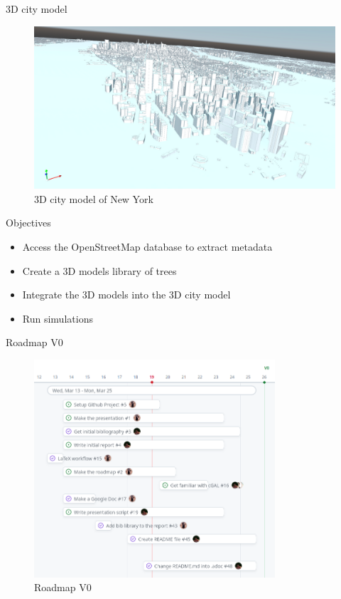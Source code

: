 \documentclass[10pt]{beamer}
\begin{document}
\begin{frame}{3D city model}
  \begin{figure}[h] %
    \centering
    \includegraphics[width=1\textwidth]{images/NY_mesh.png}
    \caption{3D city model of New York \cite{NY-mesh}} %
    \label{fig:3d_city_model} %
  \end{figure} %
\end{frame}

\begin{frame}{Objectives}
  \begin{itemize}
    \item<1-> Access the OpenStreetMap database to extract metadata
    \item<2-> Create a 3D models library of trees
    \item<3-> Integrate the 3D models into the 3D city model
    \item<4-> Run simulations
  \end{itemize}
\end{frame}

\begin{frame}{Roadmap V0}
  \begin{figure}[h] %
    \centering
    \includegraphics[width=0.8\textwidth]{images/roadmap_v0.png}
    \caption{Roadmap V0} %
    \label{fig:roadmap_v0} %
    \end{figure}
\end{frame}
\end{document}
